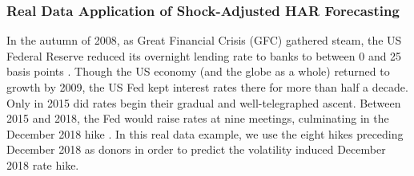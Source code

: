 \documentclass{uiucthesis2021}
\theoremstyle{definition}
\begin{document}
  \subsubsection{Real Data Application of Shock-Adjusted HAR Forecasting}
  
  In the autumn of 2008, as Great Financial Crisis (GFC) gathered steam, the US Federal Reserve reduced its overnight lending rate to banks to between 0 and 25 basis points \parencite[][]{GFC}.  Though the US economy (and the globe as a whole) returned to growth by 2009, the US Fed kept interest rates there for more than half a decade.  Only in 2015 did rates begin their gradual and well-telegraphed ascent.  Between 2015 and 2018, the Fed would raise rates at nine meetings, culminating in the December 2018 hike \parencite[][]{fedfunds}.  In this real data example, we use the eight hikes preceding December 2018 as donors in order to predict the volatility induced December 2018 rate hike.
  
\end{document}
